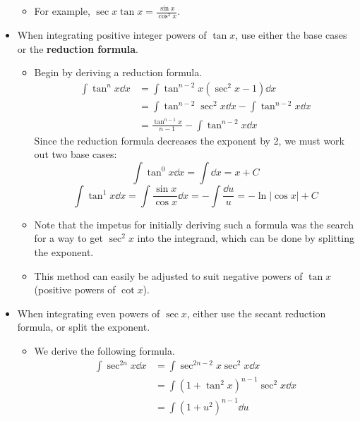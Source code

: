 \documentclass[../main.tex]{subfiles}
\begin{document}
\begin{itemize}
\begin{itemize}
        \item For example, $\sec x\tan x = \frac{\sin x}{\cos^2x}$.
    \end{itemize}
    \item When integrating positive integer powers of $\tan x$, use either the base cases or the \textbf{reduction formula}.
    \begin{itemize}
        \item Begin by deriving a reduction formula.
        \begin{align*}
            \int\tan^nx\dd{x} &= \int\tan^{n-2}x\left( \sec^2x-1 \right)\dd{x}\\
            &= \int\tan^{n-2}\sec^2x\dd{x}-\int\tan^{n-2}x\dd{x}\\
            &= \frac{\tan^{n-1}x}{n-1}-\int\tan^{n-2}x\dd{x}
        \end{align*}
        Since the reduction formula decreases the exponent by 2, we must work out two base cases:
        \begin{equation*}
            \int\tan^0 x\dd{x} = \int\dd{x} = x+C
        \end{equation*}
        \begin{equation*}
            \int\tan^1 x\dd{x} = \int\frac{\sin x}{\cos x}\dd{x}
            = -\int\frac{\dd u}{u}
            = -\ln|\cos x|+C
        \end{equation*}
        \item Note that the impetus for initially deriving such a formula was the search for a way to get $\sec^2x$ into the integrand, which can be done by splitting the exponent.
        \item This method can easily be adjusted to suit negative powers of $\tan x$ (positive powers of $\cot x$).
    \end{itemize}
    \item When integrating even powers of $\sec x$, either use the secant reduction formula, or split the exponent.
    \begin{itemize}
        \item We derive the following formula.
        \begin{align*}
            \int\sec^{2n}x\dd{x} &= \int\sec^{2n-2}x\sec^2x\dd{x}\\
            &= \int\left( 1+\tan^2x \right)^{n-1}\sec^2x\dd{x}\\
            &= \int\left( 1+u^2 \right)^{n-1}\dd{u}
        \end{align*}
    \end{itemize}

\end{itemize}
\end{document}
